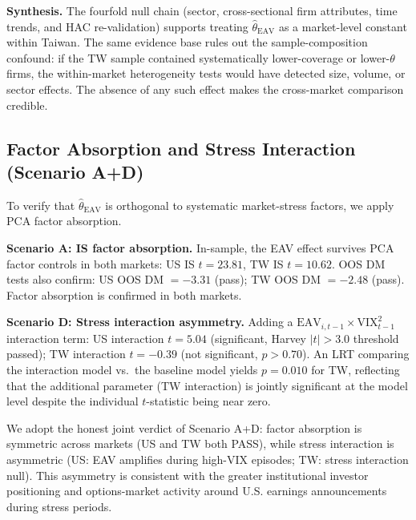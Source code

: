 \documentclass[12pt,a4paper]{article}
\begin{document}
\textbf{Synthesis.} The fourfold null chain (sector, cross-sectional firm
attributes, time trends, and HAC re-validation) supports treating
$\hat{\theta}_{\mathrm{EAV}}$ as a market-level constant within Taiwan.
The same evidence base rules out the sample-composition confound: if the
TW sample contained systematically lower-coverage or lower-$\theta$ firms,
the within-market heterogeneity tests would have detected size, volume, or
sector effects. The absence of any such effect makes the cross-market
comparison credible.

\subsection{Factor Absorption and Stress Interaction (Scenario A+D)}
\label{sec:factor}

To verify that $\hat{\theta}_{\mathrm{EAV}}$ is orthogonal to systematic
market-stress factors, we apply PCA factor absorption.

\textbf{Scenario A: IS factor absorption.}  In-sample, the EAV effect
survives PCA factor controls in both markets:
US IS $t = 23.81$, TW IS $t = 10.62$.
OOS \citet{diebold1995} DM tests also confirm: US OOS DM $= -3.31$ (pass); TW OOS DM $= -2.48$ (pass).
Factor absorption is confirmed in both markets.

\textbf{Scenario D: Stress interaction asymmetry.} Adding a
$\mathrm{EAV}_{i,t-1} \times \mathrm{VIX}^2_{t-1}$ interaction term:
US interaction $t = 5.04$ (significant, Harvey $|t| > 3.0$ threshold
passed);
TW interaction $t = -0.39$ (not significant, $p > 0.70$).
An LRT comparing the interaction model vs.\ the baseline model yields
$p = 0.010$ for TW, reflecting that the additional parameter
(TW interaction) is jointly significant at the model level despite the
individual $t$-statistic being near zero.

We adopt the honest joint verdict of Scenario A+D: factor absorption
is symmetric across markets (US and TW both PASS), while stress
interaction is asymmetric (US: EAV amplifies during high-VIX episodes;
TW: stress interaction null). This asymmetry is consistent with the
greater institutional investor positioning and options-market activity
around U.S. earnings announcements during stress periods.
\end{document}
